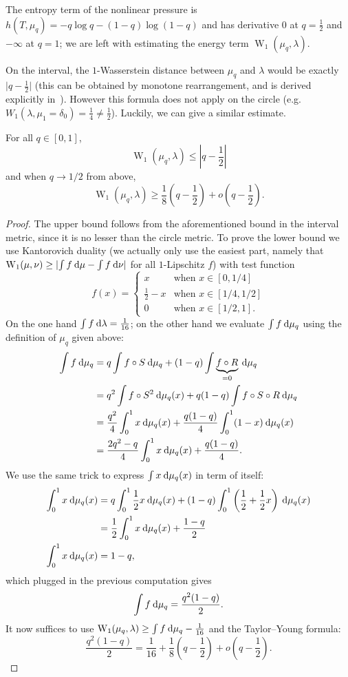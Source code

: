\documentclass[AHL, Unicode, longabstracts,published]{cedram}
\theoremstyle{plain}
\theoremstyle{plain}
\newcommand{\wass}{\operatorname{W}}
\newcommand*{\dd} {\relax\ifnum\lastnodetype>0\mskip\medmuskip\fi\mathrm{d}}
\newcommand*\8{\infty}
\begin{document}
The entropy term of the nonlinear pressure is $h(T,\mu_q)=-q\log q-(1-q)\log(1-q)$ and has derivative $0$ at $q=\frac12$ and $-\infty$ at $q=1$; we are left with estimating the energy term $\wass_1(\mu_q,\lambda)$.

On the interval, the $1$-Wasserstein distance between $\mu_q$ and $\lambda$ would be exactly $\lvert q-\frac12\rvert$ (this can be obtained by monotone rearrangement, and is derived explicitly in~\cite{Fraser2015}). However this formula does not apply on the circle (e.g. $W_1(\lambda,\mu_1=\delta_0)=\frac14\neq\frac12$). Luckily, we can give a similar estimate.

\begin{lemm}
For all $q\in[0,1]$,
\[
\wass_1(\mu_q,\lambda)\le \left\lvert q-\frac12 \right\rvert
\]
and when $q\to 1/2$ from above,
\[
\wass_1(\mu_q,\lambda) \ge \frac18\left(q-\frac12\right)+o\left(q-\frac12\right).
\]
\end{lemm}

\begin{proof}
The upper bound follows from the aforementioned bound in the interval metric, since it is no lesser than the circle metric. To prove the lower bound we use Kantorovich duality (we actually only use the easiest part, namely that $\wass_1(\mu,\nu) \ge \lvert\int f \dd \mu -\int f \dd \nu\lvert$ for all $1$-Lipschitz $f$) with test function
\[
f(x) =
\begin{cases}
x &\text{when }x\in[0,1/4] \\
\frac12-x &\text{when }x\in[1/4,1/2] \\
0 & \text{when }x\in [1/2,1].
\end{cases}
\]
On the one hand $\int f \dd\lambda = \frac{1}{16}$; on the other hand we evaluate $\int f\dd\mu_q$ using the definition of $\mu_q$ given above:
\begin{align*}
\int f\dd\mu_q &= q\int f\circ S \dd\mu_q + (1-q) \int \underbrace{f\circ R}_{=0}\dd\mu_q \\
&= q^2\int f\circ S^2 \dd\mu_q(x) + q(1-q) \int f\circ S\circ R \dd\mu_q \\
&= \frac{q^2}{4} \int_0^1 x \dd\mu_q(x) + \frac{q(1-q)}{4} \int_0^1 (1-x) \dd\mu_q(x) \\
&= \frac{2q^2-q}{4}\int_0^1 x\dd\mu_q(x) + \frac{q(1-q)}{4}.
\end{align*}
We use the same trick to express $\int x\dd\mu_q(x)$ in term of itself:
\begin{align*}
\int_0^1 x \dd\mu_q(x) &= q\int_0^1 \frac12 x \dd\mu_q(x) + (1-q)\int_0^1\left(\frac12+\frac12x\right)\dd\mu_q(x) \\
&= \frac{1}{2}\int_0^1 x \dd\mu_q(x)+\frac{1-q}{2}\\
\int_0^1 x \dd\mu_q(x) &= 1-q,
\end{align*}
which plugged in the previous computation gives
\[
\int f\dd\mu_q = \frac{q^2(1-q)}{2}.
\]
It now suffices to use $\wass_1(\mu_q,\lambda)\ge\int f\dd\mu_q-\frac{1}{16}$ and the Taylor--Young formula:
\[
\frac{q^2(1-q)}{2} = \frac{1}{16}+\frac18\left(q-\frac12\right) + o\left(q-\frac12\right).
\]
\end{proof}
\end{document}
